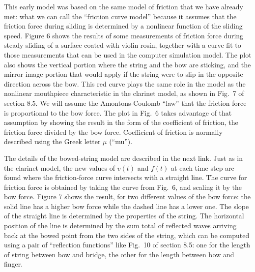   This early model was based on the same model of friction that we have already 
  met: what we can call the ``friction curve model'' because it assumes that 
  the friction force during sliding is determined by a nonlinear function of 
  the sliding speed. Figure 6 shows the results of some measurements of 
  friction force during steady sliding of a surface coated with violin rosin, 
  together with a curve fit to those measurements that can be used in the 
  computer simulation model. The plot also shows the vertical portion where the 
  string and the bow are sticking, and the mirror-image portion that would 
  apply if the string were to slip in the opposite direction across the bow. 
  This red curve plays the same role in the model as the nonlinear mouthpiece 
  characteristic in the clarinet model, as shown in Fig.\ 7 of section 8.5. We 
  will assume the Amontons-Coulomb ``law'' that the friction force is 
  proportional to the bow force. The plot in Fig.\ 6 takes advantage of that 
  assumption by showing the result in the form of the coefficient of friction, 
  the friction force divided by the bow force. Coefficient of friction is 
  normally described using the Greek letter $\mu$ (``mu''). 


  The details of the bowed-string model are described in the next link. Just as 
  in the clarinet model, the new values of $v(t)$ and $f(t)$ at each time step 
  are found where the friction-force curve intersects with a straight line. The 
  curve for friction force is obtained by taking the curve from Fig.\ 6, and 
  scaling it by the bow force. Figure 7 shows the result, for two different 
  values of the bow force: the solid line has a higher bow force while the 
  dashed line has a lower one. The slope of the straight line is determined by 
  the properties of the string. The horizontal position of the line is 
  determined by the sum total of reflected waves arriving back at the bowed 
  point from the two sides of the string, which can be computed using a pair of 
  “reflection functions” like Fig.\ 10 of section 8.5: one for the length of 
  string between bow and bridge, the other for the length between bow and 
  finger. 

